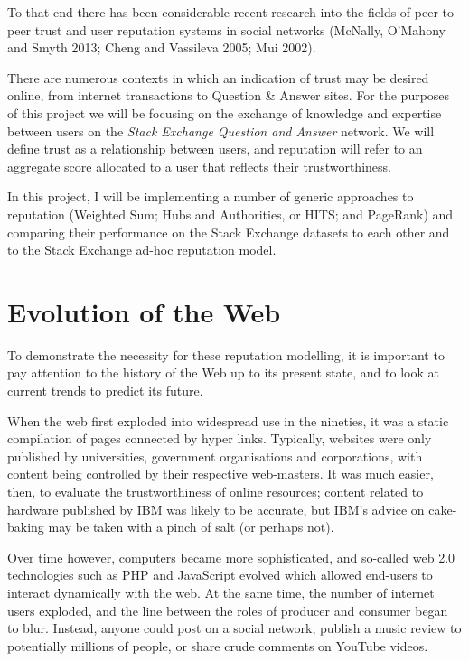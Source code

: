\documentclass[]{final_report}
\begin{document}
To that end there has been considerable recent research into the fields of peer-to-peer trust and user reputation systems in social networks (McNally, O'Mahony and Smyth 2013; Cheng and Vassileva 2005; Mui 2002).

There are numerous contexts in which an indication of trust may be desired online, from internet transactions to Question \& Answer sites. For the purposes of this project we will be focusing on the exchange of knowledge and expertise between users on the \textsl{Stack Exchange Question and Answer} network. We will define trust as a relationship between users, and reputation will refer to an aggregate score allocated to a user that reflects their trustworthiness.

In this project, I will be implementing a number of generic approaches to reputation (Weighted Sum; Hubs and Authorities, or HITS; and PageRank) and comparing their performance on the Stack Exchange datasets to each other and to the Stack Exchange ad-hoc reputation model.

\section{Evolution of the Web}

To demonstrate the necessity for these reputation modelling, it is important to pay attention to the history of the Web up to its present state, and to look at current trends to predict its future.

When the web first exploded into widespread use in the nineties, it was a static compilation of pages connected by hyper links. Typically, websites were only published by universities, government organisations and corporations, with content being controlled by their respective web-masters. It was much easier, then, to evaluate the trustworthiness of online resources; content related to hardware published by IBM was likely to be accurate, but IBM's advice on cake-baking may be taken with a pinch of salt (or perhaps not).

Over time however, computers became more sophisticated, and so-called web 2.0 technologies such as PHP and JavaScript evolved which allowed end-users to interact dynamically with the web. At the same time, the number of internet users exploded, and the line between the roles of producer and consumer began to blur. Instead, anyone could post on a social network, publish a music review to potentially millions of people, or share crude comments on YouTube videos.
\end{document}
